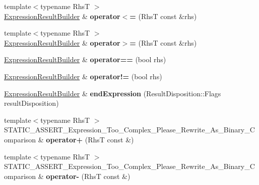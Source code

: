 \begin{DoxyCompactItemize}
\item 
{\footnotesize template$<$typename RhsT $>$ }\\\hyperlink{classCatch_1_1ExpressionResultBuilder}{Expression\+Result\+Builder} \& {\bfseries operator$<$=} (RhsT const \&rhs)\hypertarget{classCatch_1_1ExpressionLhs_a6d43fbf5741cae70b1908ed75ac19784}{}\label{classCatch_1_1ExpressionLhs_a6d43fbf5741cae70b1908ed75ac19784}

\item 
{\footnotesize template$<$typename RhsT $>$ }\\\hyperlink{classCatch_1_1ExpressionResultBuilder}{Expression\+Result\+Builder} \& {\bfseries operator$>$=} (RhsT const \&rhs)\hypertarget{classCatch_1_1ExpressionLhs_ae197c4a4d3fb35e01ede684c6e75115f}{}\label{classCatch_1_1ExpressionLhs_ae197c4a4d3fb35e01ede684c6e75115f}

\item 
\hyperlink{classCatch_1_1ExpressionResultBuilder}{Expression\+Result\+Builder} \& {\bfseries operator==} (bool rhs)\hypertarget{classCatch_1_1ExpressionLhs_a11906256509e816eb51eff3e24154d47}{}\label{classCatch_1_1ExpressionLhs_a11906256509e816eb51eff3e24154d47}

\item 
\hyperlink{classCatch_1_1ExpressionResultBuilder}{Expression\+Result\+Builder} \& {\bfseries operator!=} (bool rhs)\hypertarget{classCatch_1_1ExpressionLhs_ae4e25cde313de9d8fcaec5bcfaededb4}{}\label{classCatch_1_1ExpressionLhs_ae4e25cde313de9d8fcaec5bcfaededb4}

\item 
\hyperlink{classCatch_1_1ExpressionResultBuilder}{Expression\+Result\+Builder} \& {\bfseries end\+Expression} (Result\+Disposition\+::\+Flags result\+Disposition)\hypertarget{classCatch_1_1ExpressionLhs_a73dc3afbc25d3bff40254b322197fb25}{}\label{classCatch_1_1ExpressionLhs_a73dc3afbc25d3bff40254b322197fb25}

\item 
{\footnotesize template$<$typename RhsT $>$ }\\S\+T\+A\+T\+I\+C\+\_\+\+A\+S\+S\+E\+R\+T\+\_\+\+Expression\+\_\+\+Too\+\_\+\+Complex\+\_\+\+Please\+\_\+\+Rewrite\+\_\+\+As\+\_\+\+Binary\+\_\+\+Comparison \& {\bfseries operator+} (RhsT const \&)\hypertarget{classCatch_1_1ExpressionLhs_a29ffb8417e977f0a98c0eb537a7ca5af}{}\label{classCatch_1_1ExpressionLhs_a29ffb8417e977f0a98c0eb537a7ca5af}

\item 
{\footnotesize template$<$typename RhsT $>$ }\\S\+T\+A\+T\+I\+C\+\_\+\+A\+S\+S\+E\+R\+T\+\_\+\+Expression\+\_\+\+Too\+\_\+\+Complex\+\_\+\+Please\+\_\+\+Rewrite\+\_\+\+As\+\_\+\+Binary\+\_\+\+Comparison \& {\bfseries operator-\/} (RhsT const \&)\hypertarget{classCatch_1_1ExpressionLhs_a19ef0a33442bb18efef1ec65102151d1}{}\label{classCatch_1_1ExpressionLhs_a19ef0a33442bb18efef1ec65102151d1}


\end{DoxyCompactItemize}
